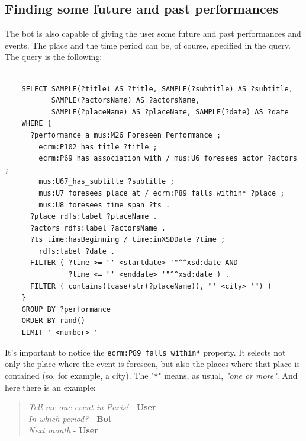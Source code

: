 \documentclass[a4paper,12pt]{report}
\begin{document}
	\subsection{Finding some future and past performances}
	The bot is also capable of giving the user some future and past performances and events. The place and the time period can be, of course, specified in the query. The query is the following:
	\begin{lstlisting}
	
	SELECT SAMPLE(?title) AS ?title, SAMPLE(?subtitle) AS ?subtitle,
	       SAMPLE(?actorsName) AS ?actorsName,
	       SAMPLE(?placeName) AS ?placeName, SAMPLE(?date) AS ?date
	WHERE {
	  ?performance a mus:M26_Foreseen_Performance ;
	    ecrm:P102_has_title ?title ;
	    ecrm:P69_has_association_with / mus:U6_foresees_actor ?actors ;
	    mus:U67_has_subtitle ?subtitle ;
	    mus:U7_foresees_place_at / ecrm:P89_falls_within* ?place ;
	    mus:U8_foresees_time_span ?ts .
	  ?place rdfs:label ?placeName .
	  ?actors rdfs:label ?actorsName .
	  ?ts time:hasBeginning / time:inXSDDate ?time ;
 	    rdfs:label ?date .
	  FILTER ( ?time >= "' <startdate> '"^^xsd:date AND
	           ?time <= "' <enddate> '"^^xsd:date ) .
	  FILTER ( contains(lcase(str(?placeName)), "' <city> '") )
	}
	GROUP BY ?performance
	ORDER BY rand()
	LIMIT ' <number> '
	\end{lstlisting}
	It's important to notice the \texttt{ecrm:P89\_falls\_within*} property. It selects not only the place where the event is foreseen, but also the places where that place is contained (so, for example, a city). The "\texttt{*}" means, as usual, \textit{"one or more"}. And here there is an example:
	\begin{verse}
		\textit{Tell me one event in Paris!} - \textbf{User}\\
		\textit{In which period?} - \textbf{Bot}\\
		\textit{Next month} - \textbf{User}\\
	\end{verse}
\end{document}
